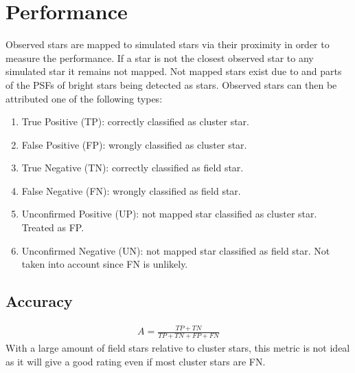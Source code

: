 \documentclass[letterpaper,10pt,english]{sphinxmanual}
\begin{document}
\section{Performance}
\label{\detokenize{NBodySimulation/Clustering:performance}}
\sphinxAtStartPar
Observed stars are mapped to simulated stars via their proximity in order to measure the performance. If a star is not the closest observed star to any simulated star it remains not mapped.
Not mapped stars exist due to {\hyperref[\detokenize{NBodySimulation/DataReduction:background-label}]{}} and parts of the PSFs of bright stars being detected as stars. Observed stars can then be attributed one of the following types:
\begin{enumerate}
%
\item {} 
\sphinxAtStartPar
True Positive (TP): correctly classified as cluster star.

\item {} 
\sphinxAtStartPar
False Positive (FP): wrongly classified as cluster star.

\item {} 
\sphinxAtStartPar
True Negative (TN): correctly classified as field star.

\item {} 
\sphinxAtStartPar
False Negative (FN): wrongly classified as field star.

\item {} 
\sphinxAtStartPar
Unconfirmed Positive (UP): not mapped star classified as cluster star. Treated as FP.

\item {} 
\sphinxAtStartPar
Unconfirmed Negative (UN): not mapped star classified as field star. Not taken into account since FN is unlikely.

\end{enumerate}


\subsection{Accuracy}
\label{\detokenize{NBodySimulation/Clustering:accuracy}}\begin{equation*}
\begin{split}A = \frac{TP+TN}{TP+TN+FP+FN}\end{split}
\end{equation*}
\sphinxAtStartPar
With a large amount of field stars relative to cluster stars, this metric is not ideal as it will give a good rating even if most cluster stars are FN.
\end{document}
